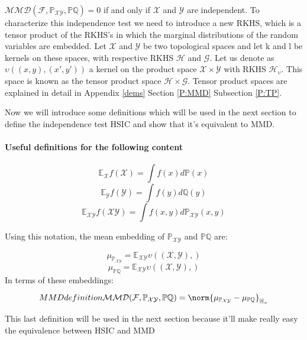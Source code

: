 $\mathcal{MMD}(\mathcal{F}, \mathbb{P}_{\mathcal{XY}},\mathbb{P}\mathbb{Q}) = 0$ if and only if $\mathcal{X}$ and $\mathcal{Y}$ are independent.
To characterize this independence test we need to introduce a new RKHS, which is a tensor product of the RKHS’s in which the marginal distributions of the random variables are embedded. Let $\mathcal{X}$ and $\mathcal{Y}$ be two topological spaces and let k and l be kernels on these spaces, with respective RKHS $\mathcal{H}$ and $\mathcal{G}$. Let us denote as $\upsilon((x, y), (x' , y ' ))$ a kernel on the product space $\mathcal{X}\times\mathcal{Y}$ with RKHS $\mathcal{H}_{\upsilon}$. This space is known as the tensor product space $\mathcal{H}\times\mathcal{G}$. Tensor product spaces are explained in detail in Appendix \ref{dems} Section \ref{P:MMD} Subsection \ref{P:TP}.

Now we will introduce some definitions which will be used in the next section to define the independence test HSIC and show that it's equivalent to MMD.

\paragraph{Useful definitions for the following content}
$$\mathbb{E}_{\mathcal{X}}f(\mathcal{X}) = \int f(x)d\mathbb{P}(x)$$
$$\mathbb{E}_{\mathcal{Y}}f(\mathcal{Y}) = \int f(y)d\mathbb{Q}(y)$$
$$\mathbb{E}_{\mathcal{X}\mathcal{Y}}f(\mathcal{X}\mathcal{Y}) = \int f(x,y)d\mathbb{P}_{\mathcal{X}\mathcal{Y}}(x,y)$$

Using this notation, the mean embedding of $\mathbb{P}_{\mathcal{X}\mathcal{Y}}$ and $\mathbb{P}\mathbb{Q}$ are:

$$\mu_{\mathbb{P}_{\mathcal{X}\mathcal{Y}}} = \mathbb{E}_{\mathcal{X}\mathcal{Y}}\upsilon((\mathcal{X},\mathcal{Y}),)$$
$$\mu_{\mathbb{P}\mathbb{Q}} = \mathbb{E}_{\mathcal{X}\mathcal{Y}}\upsilon((\mathcal{X},\mathcal{Y}),)$$
In terms of these embeddings:

\begin{equation}[MMDequiv]{MMD definition}
\mathcal{MMD}(\mathcal{F}, \mathbb{P}_{\mathcal{XY}},\mathbb{P}\mathbb{Q}) = \norm{
\mu_{\mathbb{P}_{\mathcal{X}\mathcal{Y}}}-
\mu_{\mathbb{P}\mathbb{Q}} 
}_{\mathbb{H}_{\upsilon}}
\end{equation}

This last definition will be used in the next section because it'll make really easy the equivalence between HSIC and MMD